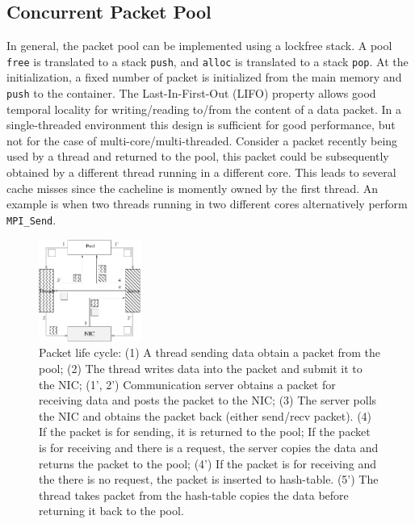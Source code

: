 \subsection{Concurrent Packet Pool}
In general, the packet pool can be implemented using a lockfree stack. A pool
\texttt{free} is translated to a stack \texttt{push}, and \texttt{alloc} is
translated to a stack \texttt{pop}. At the initialization, a fixed number of
packet is initialized from the main memory and \texttt{push} to the container.
The Last-In-First-Out (LIFO) property allows good temporal locality for
writing/reading to/from the content of a data packet. In a single-threaded
environment this design is sufficient for good performance, but not for the
case of multi-core/multi-threaded. Consider a packet recently being used by a thread
and returned to the pool, this packet could be subsequently obtained by a different thread
running in a different core. This leads to several cache misses since the cacheline
is momently owned by the first thread. An example is when two threads running in 
two different cores alternatively perform \texttt{MPI_Send}.

\begin{figure}[t]
  \centering 
  \includegraphics[width=0.3\textwidth]{fig/packetlife.pdf}
  \caption{Packet life cycle: (1) A thread sending data obtain a packet from the
    pool; (2) The thread writes data into the packet and submit it to the NIC;
    (1', 2') Communication server obtains a packet for receiving data
    and posts the packet to the NIC;
    (3) The server polls the NIC and obtains the packet back (either send/recv packet).
    (4) If the packet is for sending, it is returned to the pool;
    If the packet is for receiving and there is a request, the server copies the data
    and returns the packet to the pool;
    (4') If the packet is for receiving and the there is no request, the packet is inserted to hash-table.
    (5') The thread takes packet from the hash-table copies the data before returning it back to the pool.}
  
  \label{fig:packetlife}
\end{figure}

